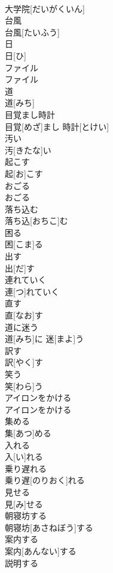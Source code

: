 \documentclass[8pt]{extreport}
\begin{document}
\begin{CJK}{UTF8}{min}
\\	大学院[だいがくいん]
\\	台風	
\\	台風[たいふう]
\\	日	
\\	日[ひ]
\\	ファイル	
\\	ファイル
\\	道	
\\	道[みち]
\\	目覚まし時計	
\\	目覚[めざ]まし 時計[とけい]
\\	汚い	
\\	汚[きたな]い
\\	起こす	
\\	起[お]こす
\\	おごる	
\\	おごる
\\	落ち込む	
\\	落ち込[おちこ]む
\\	困る	
\\	困[こま]る
\\	出す	
\\	出[だ]す
\\	連れていく	
\\	連[つ]れていく
\\	直す	
\\	直[なお]す
\\	道に迷う	
\\	道[みち]に 迷[まよ]う
\\	訳す	
\\	訳[やく]す
\\	笑う	
\\	笑[わら]う
\\	アイロンをかける	
\\	アイロンをかける
\\	集める	
\\	集[あつ]める
\\	入れる	
\\	入[い]れる
\\	乗り遅れる	
\\	乗り遅[のりおく]れる
\\	見せる	
\\	見[み]せる
\\	朝寝坊する	
\\	朝寝坊[あさねぼう]する
\\	案内する	
\\	案内[あんない]する
\\	説明する	

\end{CJK}
\end{document}
